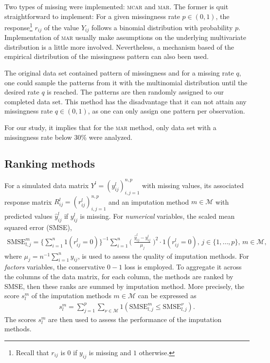Two types of missing were implemented: \textsc{mcar} and \textsc{mar}. The
former is quit straightforward to implement: For a given missingness rate
$p \in (0, 1)$, the response\footnote{Recall that $r_{ij}$ is $0$ if $y_{ij}$
  is missing and $1$ otherwise.} $r_{ij}$ of the value $Y_{ij}$ follows a
binomial distribution with probability $p$. Implementation of \textsc{mar}
usually make assumptions on the underlying multivariate distribution is a
little more involved. Nevertheless, a mechanism based of the empirical
distribution of the missingness pattern can also been used.

The original data set contained pattern of missingness and for a missing rate
$q$, one could sample the patterns from it with the multinomial distribution
until the desired rate $q$ is reached. The patterns are then randomly assigned
to our completed data set. This method has the disadvantage that it can not
attain any missingness rate $q \in (0, 1)$, as one can only assign one pattern
per observation.

For our study, it implies that for the \textsc{mar} method, only data set with
a missingness rate below 30\% were analyzed.

\subsection{Ranking methods}

For a simulated data matrix $Y^l = (y^l_{ij})_{i,j=1}^{n,p}$ with missing
values, its associated response matrix $R_{ij}^l = (r_{ij}^l)_{i,j=1}^{n, p}$
and an imputation method $m \in \mathcal{M}$ with predicted values
$\hat y^l_{ij}$ if $y^l_{ij}$ is missing. For \emph{numerical} variables, the scaled
mean squared error (SMSE),
\begin{align}\label{eq:smse}
  \textrm{SMSE}^{m}_{l,j} = \Big\{\sum_{i=1}^n 1(r^l_{ij}=0)\Big\}^{-1} \sum_{i=1}^{n} \Big(\;\frac{\hat y_{ij}^l - y^l_{ij}}{\mu_j}\;\Big)^2 \cdot 1(r^l_{ij}=0),
  \, j \in \{1, \dots, p\}, \, m \in \mathcal{M},
\end{align}
where $\mu_j = n^{-1}\sum_{i=1}^n y_{ij}$, is used to assess the quality of
imputation methods. For \emph{factors} variables, the conservative $0-1$ loss
is employed. To aggregate it across the columns of the data matrix, for each
column, the methods are ranked by SMSE, then these ranks are summed by
imputation method. More precisely, the score $s^m_l$ of the imputation methods
$m \in \mathcal{M}$ can be expressed as
\begin{align} \label{eq:score:imputation}
  s^{m}_{l} = \sum_{j=1}^p \sum_{\nu \in \mathcal{M}} 1(\textrm{SMSE}^{m}_{l,j} \leq \textrm{SMSE}^{\nu}_{l,j}).
\end{align}
The scores $s^m_l$ are then used to assess the performance of the imputation
methods.

